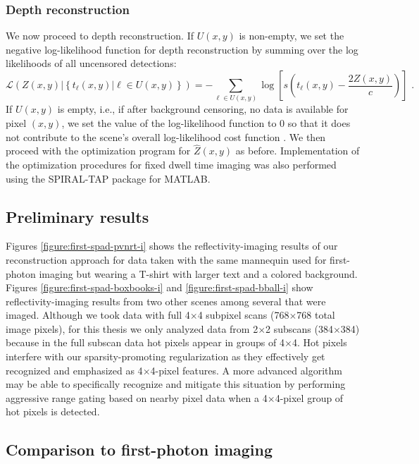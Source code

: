 \subsubsection{Depth reconstruction}
We now proceed to depth reconstruction. If $U(x,y)$ is non-empty, we set the negative log-likelihood function for depth reconstruction by summing over the log likelihoods of all uncensored detections:
\begin{equation}
\mathcal{L}\left( Z(x,y) | \left\{t_\ell(x,y) | \ell \in U(x,y) \right\} \right) = - \sum_{\ell \in U(x,y)} \log\left[ s(t_\ell(x,y) - \frac{2Z(x,y)}{c}) \right]\,\,.
\end{equation}
If $U(x,y)$ is empty, i.e., if after background censoring, no data is available for pixel $(x,y)$, we set the value of the log-likelihood function to $0$ so that it does not contribute to the scene's overall log-likelihood cost function \cite{kirmani-photon}. We then proceed with the optimization program for $\hat{Z}(x,y)$ as before. Implementation of the optimization procedures for fixed dwell time imaging was also performed using the SPIRAL-TAP package for MATLAB.

\subsection{Preliminary results}

Figures \ref{figure:first-spad-pvnrt-i} shows the reflectivity-imaging results of our reconstruction approach for data taken with the same mannequin used for first-photon imaging but wearing a T-shirt with larger text and a colored background. Figures \ref{figure:first-spad-boxbooks-i} and \ref{figure:first-spad-bball-i} show reflectivity-imaging results from two other scenes among several that were imaged. Although we took data with full 4$\times$4 subpixel scans (768$\times$768 total image pixels), for this thesis we only analyzed data from 2$\times$2 subscans (384$\times$384) because in the full subscan data hot pixels appear in groups of 4$\times$4. Hot pixels interfere with our sparsity-promoting regularization as they effectively get recognized and emphasized as 4$\times$4-pixel features. A more advanced algorithm may be able to specifically recognize and mitigate this situation by performing aggressive range gating based on nearby pixel data when a 4$\times$4-pixel group of hot pixels is detected.

\subsection{Comparison to first-photon imaging}

